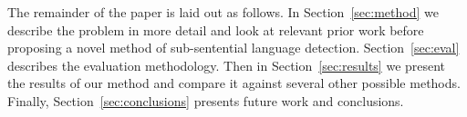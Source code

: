 \documentclass[11pt]{article}
\begin{document}
The remainder of the paper is laid out as follows. In Section~\ref{sec:method} we describe the problem
in more detail and look at relevant prior work before proposing a novel method of sub-sentential
language detection. Section~\ref{sec:eval} describes the evaluation methodology. Then in Section~\ref{sec:results}
we present the results of our method and compare it against several other possible methods. Finally, Section~\ref{sec:conclusions}
presents future work and conclusions.


\end{document}
